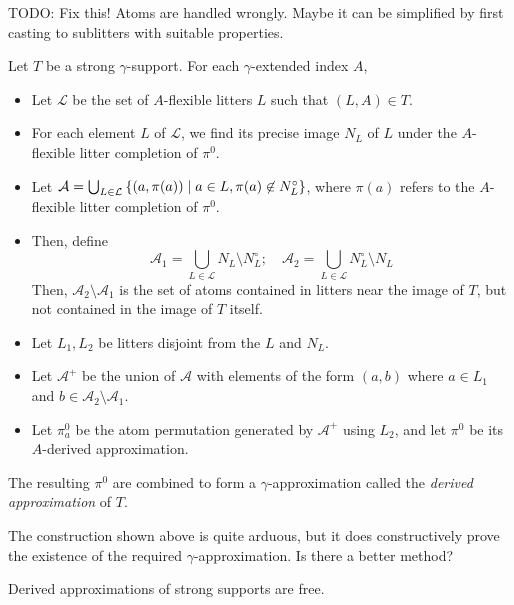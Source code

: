 \documentclass{article}
\begin{document}
\begin{definition}
    TODO: Fix this! Atoms are handled wrongly.
    Maybe it can be simplified by first casting to sublitters with suitable properties.

    Let \( T \) be a strong \( \gamma \)-support.
    For each \( \gamma \)-extended index \( A \),
    \begin{itemize}
        \item Let \( \mathcal L \) be the set of \( A \)-flexible litters \( L \) such that \( (L, A) \in T \).
        \item For each element \( L \) of \( \mathcal L \), we find its precise image \( N_L \) of \( L \) under the \( A \)-flexible litter completion of \( \pi^0 \).
        \item Let \( \mathcal A = \bigcup_{L \in \mathcal L} \qty{(a, \pi(a)) \mid a \in L, \pi(a) \not\in N_L^\circ} \), where \( \pi(a) \) refers to the \( A \)-flexible litter completion of \( \pi^0 \).
        \item Then, define
        \[ \mathcal A_1 = \bigcup_{L \in \mathcal L} N_L \setminus N_L^\circ;\quad \mathcal A_2 = \bigcup_{L \in \mathcal L} N_L^\circ \setminus N_L \]
        Then, \( \mathcal A_2 \setminus \mathcal A_1 \) is the set of atoms contained in litters near the image of \( T \), but not contained in the image of \( T \) itself.
        \item Let \( L_1, L_2 \) be litters disjoint from the \( L \) and \( N_L \).
        \item Let \( \mathcal A^+ \) be the union of \( \mathcal A \) with elements of the form \( (a, b) \) where \( a \in L_1 \) and \( b \in \mathcal A_2 \setminus \mathcal A_1 \).
        \item Let \( \pi^0_a \) be the atom permutation generated by \( \mathcal A^+ \) using \( L_2 \), and let \( \pi^0 \) be its \( A \)-derived approximation.
    \end{itemize}
    The resulting \( \pi^0 \) are combined to form a \( \gamma \)-approximation called the \emph{derived approximation} of \( T \).
\end{definition}
\begin{remark}
    The construction shown above is quite arduous, but it does constructively prove the existence of the required \( \gamma \)-approximation.
    Is there a better method?
\end{remark}
\begin{lemma}
    Derived approximations of strong supports are free.
\end{lemma}
\end{document}
